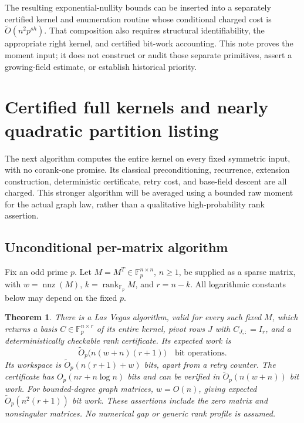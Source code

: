 \documentclass[11pt]{article}
\newtheorem{theorem}{Theorem}[section]
\theoremstyle{definition}
\theoremstyle{remark}
\newcommand{\1}{\mathbf 1}
\providecommand{\F}{\mathbb F}
\providecommand{\rank}{\operatorname{rank}}
\providecommand{\nnz}{\operatorname{nnz}}
\begin{document}
The resulting exponential-nullity bounds can be inserted into a separately certified kernel and enumeration routine whose conditional charged cost is $\widetilde O(n^2p^{s h})$. That composition also requires structural identifiability, the appropriate right kernel, and certified bit-work accounting. This note proves the moment input; it does not construct or audit those separate primitives, assert a growing-field estimate, or establish historical priority.


\clearpage
\section{Certified full kernels and nearly quadratic partition listing}\label{rec:sec:full-kernel}
The next algorithm computes the entire kernel on every fixed symmetric
input, with no corank-one promise. Its classical preconditioning,
recurrence, extension construction, deterministic certificate, retry
cost, and base-field descent are all charged. This stronger algorithm
will be averaged using a bounded raw moment for the actual graph law,
rather than a qualitative high-probability rank assertion.

\subsection{Unconditional per-matrix algorithm}
Fix an odd prime $p$. Let $M=M^T\in\F_p^{n\times n}$, $n\ge1$,
be supplied as a sparse matrix, with $w=\nnz(M)$,
$k=\rank_{\F_p}M$, and $r=n-k$.
All logarithmic constants below may depend on the fixed $p$.

\begin{theorem}\label{rec:fk:thm:kernel}
There is a Las Vegas algorithm, valid for every such fixed $M$,
which returns a basis $C\in\F_p^{n\times r}$ of its entire kernel,
pivot rows $J$ with $C_{J,:}=I_r$, and a deterministically checkable
rank certificate. Its expected work is
\[
 \widetilde O_p\bigl(n(w+n)(r+1)\bigr)
 \quad\text{bit operations}.
\]
Its workspace is $\widetilde O_p(n(r+1)+w)$ bits, apart from a retry
counter. The certificate has $O_p(nr+n\log n)$ bits and can be
verified in $\widetilde O_p(n(w+n))$ bit work.
For bounded-degree graph matrices, $w=O(n)$, giving expected
$\widetilde O_p(n^2(r+1))$ bit work. These assertions include the
zero matrix and nonsingular matrices. No numerical gap or generic
rank profile is assumed.
\end{theorem}
\end{document}
